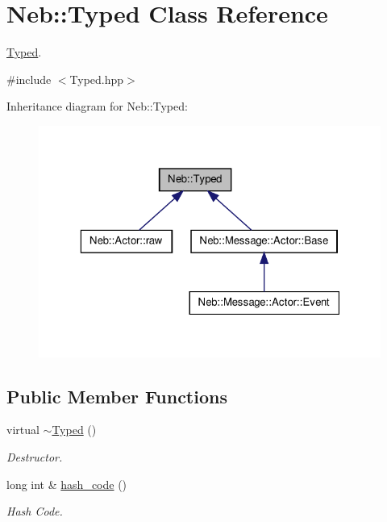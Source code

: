 \hypertarget{classNeb_1_1Typed}{\section{\-Neb\-:\-:\-Typed \-Class \-Reference}
\label{classNeb_1_1Typed}
}


\hyperlink{classNeb_1_1Typed}{\-Typed}.  




{\ttfamily \#include $<$\-Typed.\-hpp$>$}



\-Inheritance diagram for \-Neb\-:\-:\-Typed\-:\nopagebreak
\begin{figure}[H]
\begin{center}
\leavevmode
\includegraphics[width=323pt]{classNeb_1_1Typed__inherit__graph}
\end{center}
\end{figure}
\subsection*{\-Public \-Member \-Functions}
\begin{DoxyCompactItemize}
\item 
\hypertarget{classNeb_1_1Typed_ac7a0fd653ad4c09abc20fc9f24942042}{virtual \hyperlink{classNeb_1_1Typed_ac7a0fd653ad4c09abc20fc9f24942042}{$\sim$\-Typed} ()}\label{classNeb_1_1Typed_ac7a0fd653ad4c09abc20fc9f24942042}

\begin{DoxyCompactList}\small\item\em \-Destructor. \end{DoxyCompactList}\item 
\hypertarget{classNeb_1_1Typed_a75878612e933c37ce060bb0d63889051}{long int \& \hyperlink{classNeb_1_1Typed_a75878612e933c37ce060bb0d63889051}{hash\-\_\-code} ()}\label{classNeb_1_1Typed_a75878612e933c37ce060bb0d63889051}

\begin{DoxyCompactList}\small\item\em \-Hash \-Code. \end{DoxyCompactList}\end{DoxyCompactItemize}
